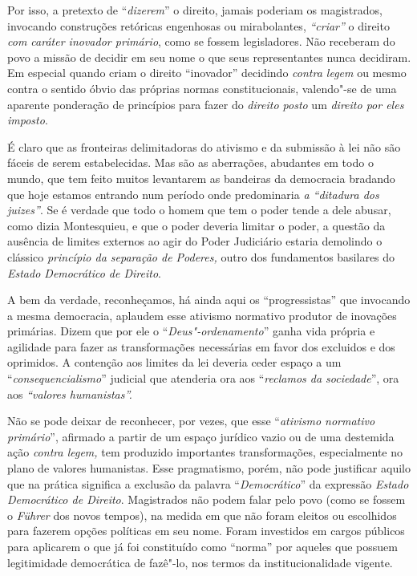 Por isso, a pretexto de ``\emph{dizerem}'' o direito, jamais poderiam os
magistrados, invocando construções retóricas engenhosas ou mirabolantes,
\emph{``criar''} o direito \emph{com caráter inovador primário}, como se
fossem legisladores. Não receberam do povo a missão de decidir em seu
nome o que seus representantes nunca decidiram. Em especial quando criam
o direito ``inovador'' decidindo \emph{contra legem} ou mesmo contra o
sentido óbvio das próprias normas constitucionais, valendo"-se de uma
aparente ponderação de princípios para fazer do \emph{direito posto} um
\emph{direito por eles imposto}.

É claro que as fronteiras delimitadoras do ativismo e da submissão à lei
não são fáceis de serem estabelecidas. Mas são as aberrações, abudantes
em todo o mundo, que tem feito muitos levantarem as bandeiras da
democracia bradando que hoje estamos entrando num período onde
predominaria \emph{a ``ditadura dos juizes''}. Se é verdade que todo o
homem que tem o poder tende a dele abusar, como dizia Montesquieu, e que
o poder deveria limitar o poder, a questão da ausência de limites
externos ao agir do Poder Judiciário estaria demolindo o clássico
\emph{princípio da separação de Poderes,} outro dos fundamentos
basilares do \emph{Estado Democrático de Direito}.

A bem da verdade, reconheçamos, há ainda aqui os ``progressistas'' que
invocando a mesma democracia, aplaudem esse ativismo normativo produtor
de inovações primárias. Dizem que por ele o ``\emph{Deus"-ordenamento}''
ganha vida própria e agilidade para fazer as transformações necessárias
em favor dos excluidos e dos oprimidos. A contenção aos limites da lei
deveria ceder espaço a um ``\emph{consequencialismo}'' judicial que
atenderia ora aos ``\emph{reclamos da sociedade}'', ora aos
\emph{``valores humanistas''.}

Não se pode deixar de reconhecer, por vezes, que esse ``\emph{ativismo
normativo primário}'', afirmado a partir de um espaço jurídico vazio ou
de uma destemida ação \emph{contra legem,} tem produzido importantes
transformações, especialmente no plano de valores humanistas. Esse
pragmatismo, porém, não pode justificar aquilo que na prática significa
a exclusão da palavra ``\emph{Democrático}'' da expressão \emph{Estado
Democrático de Direito}. Magistrados não podem falar pelo povo (como se
fossem o \emph{Führer} dos novos tempos), na medida em que não foram
eleitos ou escolhidos para fazerem opções políticas em seu nome. Foram
investidos em cargos públicos para aplicarem o que já foi constituído
como ``norma'' por aqueles que possuem legitimidade democrática de
fazê"-lo, nos termos da institucionalidade vigente.

